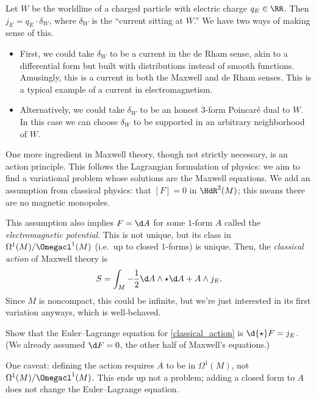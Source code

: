 Let $W$ be the worldline of a charged particle with electric charge $q_E\in\RR$. Then $j_E = q_E\cdot\delta_W$,
where $\delta_W$ is the ``current sitting at $W$.'' We have two ways of making sense of this.
\begin{itemize}
	\item First, we could take $\delta_W$ to be a current in the de Rham sense, akin to a differential form but
	built with distributions instead of smooth functions. Amusingly, this is a current in both the Maxwell and de
	Rham senses. This is a typical example of a current in electromagnetism.
	\item Alternatively, we could take $\delta_W$ to be an honest $3$-form Poincaré dual to $W$. In this case we
	can choose $\delta_W$ to be supported in an arbitrary neighborhood of $W$.
\end{itemize}
One more ingredient in Maxwell theory, though not strictly necessary, is an action principle. This follows the
Lagrangian formulation of physics: we aim to find a variational problem whose solutions are the Maxwell equations.
We add an assumption from classical physics: that $[F] = 0$ in $\HdR^2(M)$; this means there are no magnetic
monopoles.

This assumption also implies $F = \d A$ for some $1$-form $A$ called the \emph{electromagnetic potential}.
 This is not unique, but its class in $\Omega^1(M)/\Omegacl^1(M)$
(i.e.\ up to closed $1$-forms) is unique.  Then, the \emph{classical action} 
of Maxwell theory is
\begin{equation}
\label{classical_action}
	S = \int_M -\frac{1}{2} \d A\wedge {\star} \d A + A\wedge j_E.
\end{equation}
Since $M$ is noncompact, this could be infinite, but we're just interested in its first variation anyways, which is
well-behaved.
\begin{exercise}
Show that the Euler--Lagrange equation for \eqref{classical_action} is $\d{\star} F = j_E$. (We already assumed $\d
F = 0$, the other half of Maxwell's equations.)
\end{exercise}
One caveat: defining the action requires $A$ to be in $\Omega^1(M)$, not
$\Omega^1(M)/\Omegacl^1(M)$. This ends up not a problem; adding a closed form to $A$ does not change
the Euler--Lagrange equation.

